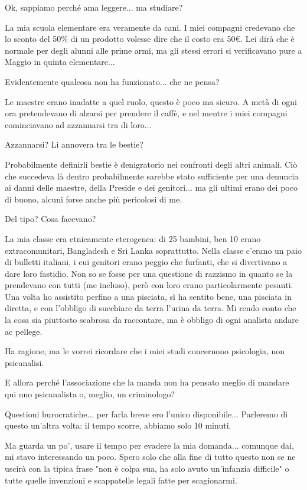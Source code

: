 \documentclass[a4paper,12pt]{article}
\newcommand{\Walter}{\speak{W}}
\newcommand{\Pollazzi}{\speak{P}}
\begin{document}
\begin{dialogue}
\Pollazzi Ok, sappiamo perché ama leggere... ma studiare?

\Walter La mia scuola elementare era veramente da cani. I miei compagni credevano che lo sconto del 50\% di un prodotto volesse dire che il costo era 50€. Lei dirà che è normale per degli alunni alle prime armi, ma gli stessi errori si verificavano pure a Maggio in quinta elementare...

\Pollazzi Evidentemente qualcosa non ha funzionato... che ne pensa?

\Walter Le maestre erano inadatte a quel ruolo, questo è poco ma sicuro. A metà di ogni ora pretendevano di alzarsi per prendere il caffè, e nel mentre i miei compagni cominciavano ad azzannarsi tra di loro...

\Pollazzi Azzannarsi? Li annovera tra le bestie?

\Walter Probabilmente definirli bestie è denigratorio nei confronti degli altri animali. Ciò che succedeva là dentro probabilmente sarebbe stato sufficiente per una denuncia ai danni delle maestre, della Preside e dei genitori... ma gli ultimi erano dei poco di buono, alcuni forse anche più pericolosi di me.

\Pollazzi Del tipo? Cosa facevano?

\Walter La mia classe era etnicamente eterogenea: di 25 bambini, ben 10 erano extracomunitari, Bangladesh e Sri Lanka soprattutto. Nella classe c'erano un paio di bulletti italiani, i cui genitori erano peggio che furfanti, che si divertivano a dare loro fastidio. Non so se fosse per una questione di razzismo in quanto se la prendevano con tutti (me incluso), però con loro erano particolarmente pesanti. Una volta ho assistito perfino a una pisciata, sì ha sentito bene, una pisciata in diretta, e con l'obbligo di succhiare da terra l'urina da terra. Mi rendo conto che la cosa sia piuttosto scabrosa da raccontare, ma è obbligo di ogni analista andare ac pellege.

\Pollazzi Ha ragione, ma le vorrei ricordare che i miei studi concernono psicologia, non psicanalisi.

\Walter E allora perché l'associazione che la manda non ha pensato meglio di mandare qui uno psicanalista o, meglio, un criminologo?

\Pollazzi Questioni burocratiche... per farla breve ero l'unico disponibile... Parleremo di questo un'altra volta: il tempo scorre, abbiamo solo 10 minuti.

\Walter Ma guarda un po', usare il tempo per evadere la mia domanda... comunque dai, mi stavo interessando un poco. Spero solo che alla fine di tutto questo non se ne uscirà con la tipica frase "non è colpa sua, ha solo avuto un'infanzia difficile" o tutte quelle invenzioni e scappatelle legali fatte per scagionarmi.


\end{dialogue}
\end{document}
